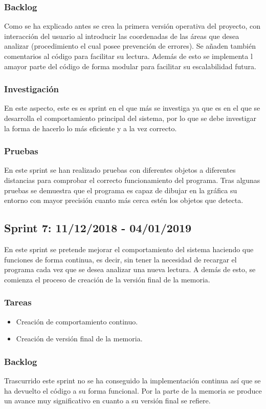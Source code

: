 \subsubsection{Backlog}
Como se ha explicado antes se crea la primera versión operativa del proyecto, con interacción del usuario al introducir las coordenadas de las áreas que desea analizar (procedimiento el cual posee prevención de errores). Se añaden también comentarios al código para facilitar su lectura. Además de esto se implementa l amayor parte del código de forma modular para facilitar su escalabilidad futura.
\subsubsection{Investigación}
En este aspecto, este es es sprint en el que más se investiga ya que es en el que se desarrolla el comportamiento principal del sistema, por lo que se debe investigar la forma de hacerlo lo más eficiente y a la vez correcto.
\subsubsection{Pruebas}
En este sprint se han realizado pruebas con diferentes objetos a diferentes distancias para comprobar el correcto funcionamiento del programa. Tras algunas pruebas se demuestra que el programa es capaz de dibujar en la gráfica su entorno con mayor precisión cuanto más cerca estén los objetos que detecta.

\subsection{Sprint 7: 11/12/2018 - 04/01/2019}
En este sprint se pretende mejorar el comportamiento del sistema haciendo que funciones de forma continua, es decir, sin tener la necesidad de recargar el programa cada vez que se desea analizar una nueva lectura. A demás de esto, se comienza el proceso de creación de la versión final de la memoria.
\subsubsection{Tareas}
\begin{itemize}
	\item Creación de comportamiento continuo.
	\item Creación de versión final de la memoria.
\end{itemize}
\subsubsection{Backlog}
Trascurrido este sprint no se ha conseguido la implementación continua así que se ha devuelto el código a su forma funcional. Por la parte de la memoria se produce un avance muy significativo en cuanto a su versión final se refiere.
